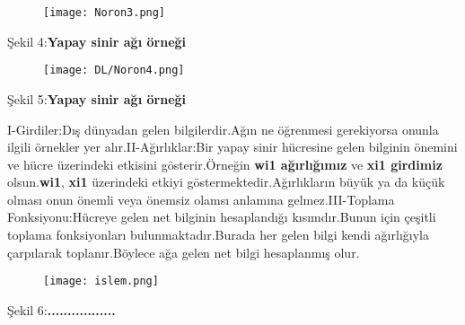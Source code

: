 \documentclass{beamer}                                                                                          %
\begin{document}
	
	\begin{frame}{}
	    \begin{figure}
	        \centering
	        \texttt{[image: Noron3.png]}
	    \end{figure}
	    \centering
	    \color{myred1}Şekil 4:\color{black}\textbf{Yapay sinir ağı örneği}
    \end{frame}
    
	
	\begin{frame}{}
	    \begin{figure}
	        \centering
	        \texttt{[image: DL/Noron4.png]}
	    \end{figure}
	    \centering
	    \color{myred1}Şekil 5:\color{black}\textbf{Yapay sinir ağı örneği}
	\end{frame}
	
    
    \begin{frame}
	    \justifying
            \color{myred1}
		        I-Girdiler:\color{black}Dış dünyadan gelen bilgilerdir.Ağın ne öğrenmesi gerekiyorsa onunla ilgili örnekler yer alır.\newline \newline \color{myred1}II-Ağırlıklar:\color{black}Bir yapay sinir hücresine gelen bilginin önemini ve hücre üzerindeki etkisini gösterir.Örneğin \textbf{wi1 ağırlığımız} ve \textbf{xi1 girdimiz} olsun.\textbf{wi1}, \textbf{xi1} üzerindeki etkiyi göstermektedir.Ağırlıkların büyük ya da küçük olması onun önemli veya önemsiz olamsı anlamına gelmez.\newline \newline \color{myred1}III-Toplama Fonksiyonu:\color{black}Hücreye gelen net bilginin hesaplandığı kısımdır.Bunun için çeşitli toplama fonksiyonları bulunmaktadır.Burada her gelen bilgi kendi ağırlığıyla çarpılarak toplanır.Böylece ağa gelen net bilgi hesaplanmış olur.
    \end{frame}
    
	
	\begin{frame}{}
	    \begin{figure}
	        \centering
	        \texttt{[image: islem.png]}
	    \end{figure}
	    \centering
	    \color{myred1}Şekil 6:\color{black}\textbf{.................}
	\end{frame}
	
\end{document}
